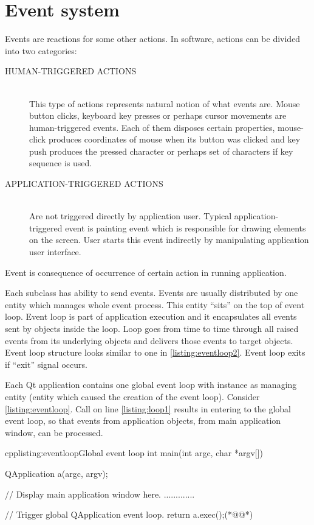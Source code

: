 \chapter{Event system}\label{section:events}
Events are reactions for some other actions. In software, actions can be divided into two categories:
\begin{description}
\item[HUMAN-TRIGGERED ACTIONS] \hfill \\
This type of actions represents natural notion of what events are. Mouse button clicks, keyboard key presses or perhaps cursor movements are human-triggered events. Each of them disposes certain properties, \eg mouse-click produces coordinates of mouse when its button was clicked and key push produces the pressed character or perhaps set of characters if key sequence is used.
\item[APPLICATION-TRIGGERED ACTIONS]  \hfill \\
Are not triggered directly by application user. Typical application-triggered event is painting event which is responsible for drawing  elements on the screen. User starts this event indirectly by manipulating application user interface.
\end{description}

Event is consequence of occurrence of certain action in running application.

Each subclass has ability to send events. Events are usually distributed by one entity which manages whole event process. This entity \enquote{sits} on the top of event loop. Event loop is part of application execution and it encapsulates all events sent by objects inside the loop. Loop goes from time to time through all raised events from its underlying objects and delivers those events to target objects. Event loop structure looks similar to one in \autoref{listing:eventloop2}. Event loop exits if \enquote{exit} signal occurs.

Each Qt application contains one global event loop with instance as managing entity (entity which caused the creation of the event loop). Consider \autoref{listing:eventloop}. Call on line \ref{listing:loop1} results in entering to the global event loop, so that events from application objects, \eg from main application window, can be processed.


\begin{fdoccode}{cpp}{listing:eventloop}{Global event loop}
int main(int argc, char *argv[]) {
    QApplication a(argc, argv);
    
    // Display main application window here.
    .............

	// Trigger global QApplication event loop.
    return a.exec();(*@\label{listing:loop1}@*)
}
\end{fdoccode}

